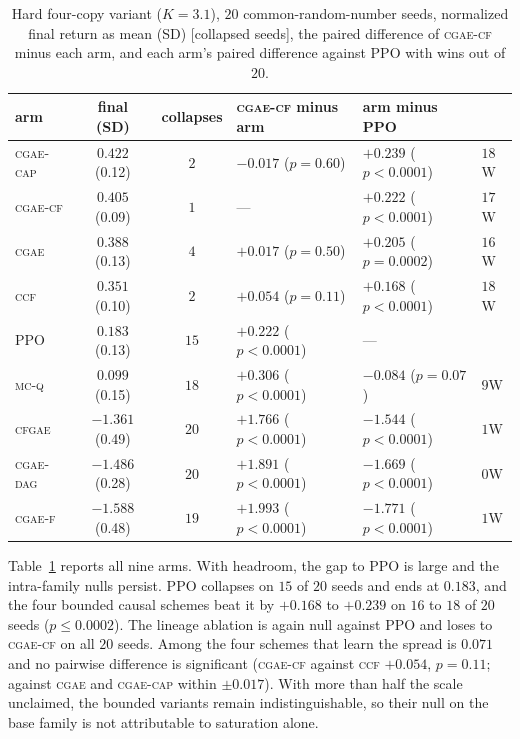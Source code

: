 \documentclass[review,authoryear,3p,times]{elsarticle}
\newcommand{\cgae}{\textsc{cgae}}              %
\newcommand{\cflow}{\textsc{cgae-cf}}          %
\newcommand{\cflowraw}{\textsc{cgae-f}}        %
\newcommand{\cdag}{\textsc{cgae-dag}}          %
\newcommand{\ccap}{\textsc{cgae-cap}}          %
\newcommand{\ccf}{\textsc{ccf}}
\newcommand{\mcq}{\textsc{mc-q}}
\newcommand{\cfgae}{\textsc{cfgae}}
\begin{document}
\begin{table}[tbp]
\centering
\caption{Hard four-copy variant ($K{=}3.1$), $20$ common-random-number seeds,
normalized final return as mean (SD) [collapsed seeds], the paired difference
of \cflow{} minus each arm, and each arm's paired difference against PPO with
wins out of $20$.}
\label{tab:hard}
\small
\begin{tabular}{lcclll}
\toprule
arm & final (SD) & collapses & \cflow{} minus arm & arm minus PPO & \\
\midrule
\ccap      & $0.422$ {\tiny(0.12)} & $2$  & $-0.017$ ($p=0.60$) & $+0.239$ ($p<0.0001$) & $18$W \\
\cflow     & $0.405$ {\tiny(0.09)} & $1$  & --- & $+0.222$ ($p<0.0001$) & $17$W \\
\cgae      & $0.388$ {\tiny(0.13)} & $4$  & $+0.017$ ($p=0.50$) & $+0.205$ ($p=0.0002$) & $16$W \\
\ccf       & $0.351$ {\tiny(0.10)} & $2$  & $+0.054$ ($p=0.11$) & $+0.168$ ($p<0.0001$) & $18$W \\
PPO        & $0.183$ {\tiny(0.13)} & $15$ & $+0.222$ ($p<0.0001$) & --- & \\
\mcq       & $0.099$ {\tiny(0.15)} & $18$ & $+0.306$ ($p<0.0001$) & $-0.084$ ($p=0.07$) & $9$W \\
\cfgae     & $-1.361$ {\tiny(0.49)} & $20$ & $+1.766$ ($p<0.0001$) & $-1.544$ ($p<0.0001$) & $1$W \\
\cdag      & $-1.486$ {\tiny(0.28)} & $20$ & $+1.891$ ($p<0.0001$) & $-1.669$ ($p<0.0001$) & $0$W \\
\cflowraw  & $-1.588$ {\tiny(0.48)} & $19$ & $+1.993$ ($p<0.0001$) & $-1.771$ ($p<0.0001$) & $1$W \\
\bottomrule
\end{tabular}
\end{table}

Table~\ref{tab:hard} reports all nine arms. With headroom, the gap to PPO is
large and the intra-family nulls persist. PPO collapses on $15$ of $20$ seeds
and ends at $0.183$, and the four bounded causal schemes beat it by $+0.168$ to
$+0.239$ on $16$ to $18$ of $20$ seeds ($p\le0.0002$). The lineage ablation is
again null against PPO and loses to \cflow{} on all $20$ seeds. Among the four
schemes that learn the spread is $0.071$ and no pairwise difference is
significant (\cflow{} against \ccf{} $+0.054$, $p=0.11$; against \cgae{} and
\ccap{} within $\pm0.017$). With more than half the scale unclaimed, the
bounded variants remain indistinguishable, so their null on the base family is
not attributable to saturation alone.
\end{document}
